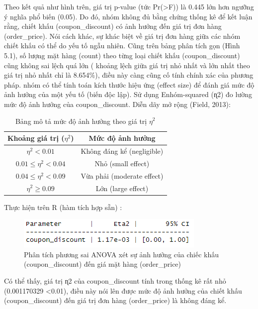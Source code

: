 Theo kết quả như hình trên, giá trị p-value (tức Pr(>F)) là 0.445 lớn hơn ngưỡng ý nghĩa phổ biến (0.05). Do đó, nhóm không đủ bằng chứng thống kê để kết luận rằng, chiết khấu (coupon\_discount) có ảnh hưởng đến giá trị đơn hàng (order\_price). Nói cách khác, sự khác biệt về giá trị đơn hàng giữa các nhóm chiết khấu có thể do yếu tố ngẫu nhiên.
Cũng trên bảng phân tích gọn (Hình 5.1),  số lượng mặt hàng (count) theo từng loại chiết khấu (coupon\_discount) cũng  không sai lệch quá lớn ( khoảng lệch giữa giá trị nhỏ nhất và lớn nhất theo giá trị nhỏ nhất chỉ là 8.654\%), điều này càng cũng cố tính chính xác của phương pháp.
nhóm có thể tính toán kích thước hiệu ứng (effect size) để đánh giá mức độ ảnh hưởng của một yếu tố (biến độc lập). Sử dụng Enhóm-squared (ɳ2) đo lường mức độ ảnh hưởng của coupon\_discount. Diễn dãy mở rộng (Field, 2013):

\begin{table}[ht]
    \centering
    \begin{tabular}{|c|c|}
    \hline
    \textbf{Khoảng giá trị ($\eta^2$)} & \textbf{Mức độ ảnh hưởng} \\ 
    \hline
    $\eta^2 < 0.01$ & Không đáng kể (negligible) \\ 
    \hline
    $0.01 \leq \eta^2 < 0.04$ & Nhỏ (small effect) \\ 
    \hline
    $0.04 \leq \eta^2 < 0.09$ & Vừa phải (moderate effect) \\ 
    \hline
    $\eta^2 \geq 0.09$ & Lớn (large effect) \\ 
    \hline
    \end{tabular}
    \caption{Bảng mô tả mức độ ảnh hưởng theo giá trị $\eta^2$}
    \label{table:effect_size}
\end{table}

Thực hiện trên R (hàm tích hợp sẵn) :
\begin{figure}[!htbp]
    \centering
    \includegraphics[width=0.6\linewidth]{graphics/5.3.3.png}
    \caption{Phân tích phương sai ANOVA xét sự ảnh hưởng của chiếc khấu (coupon\_discount) đến giá mặt hàng (order\_price)}
\end{figure}

Có thể thấy, giá trị ɳ2  của  coupon\_discount  tính trong thống kê rất nhỏ (0.001170329 <0.01), điều này nói lên được mức độ ảnh hưởng của chiết khấu (coupon\_discount) đến giá trị đơn hàng (order\_price) là không đáng kể.